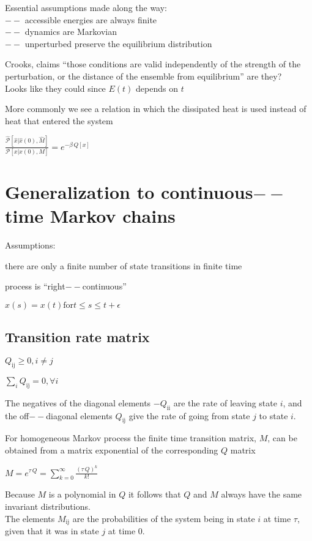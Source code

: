\documentclass{article}
\begin{document}
Essential assumptions made along the way:\\
$--$ accessible energies are always finite\\
$--$ dynamics are Markovian\\
$--$ unperturbed preserve the equilibrium distribution

Crooks, claims {``}those conditions are valid independently of the strength of the perturbation, or the distance of the ensemble from equilibrium{''}
are they?\\
Looks like they could since \(E(t)\) depends on \(t\)

More commonly we see a relation in which the dissipated heat is used instead of heat that entered the system

\(\frac{\hat{\mathcal{P}}\left[\hat{x}|\hat{x}(0),\hat{M}\right]}{\mathcal{P}[x|x(0),M]}=e^{-\beta \, Q[x]}\)

\section*{Generalization to continuous$--$time Markov chains}

Assumptions:

there are only a finite number of state transitions in finite time

process is {``}right$--$continuous{''} 

\(x(s)=x(t) \text{for} t\leq s\leq t+\epsilon\)

\subsection*{Transition rate matrix}

\(Q_{\text{ij}}\geq 0, i\neq j\)

\(\sum _i Q_{\text{ij}}=0, \forall i\)

The negatives of the diagonal elements \(-Q_{\text{ii}}\) are the rate of leaving state \(i\), and the off$--$diagonal elements \(Q_{\text{ij}}\)
give the rate of going from state \(j\) to state \(i\).

For homogeneous Markov process the finite time transition matrix, \(M\), can be obtained from a matrix exponential of the corresponding \(Q\) matrix

\(M=e^{\tau \, Q}=\sum _{k=0}^{\infty } \frac{(\tau \, Q)^k}{k!}\)

Because \(M\) is a polynomial in \(Q\) it follows that \(Q\) and \(M\) always have the same invariant distributions.\\
The elements \(M_{\text{ij}}\) are the probabilities of the system being in state \(i\) at time \(\tau\), given that it was in state \(j\) at time
\(0\).
\end{document}
